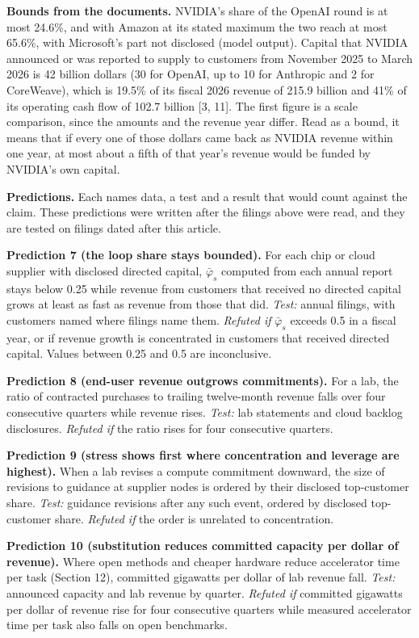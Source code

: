 \documentclass[10pt,letterpaper]{article}
\begin{document}
\textbf{Bounds from the documents.} NVIDIA's share of the OpenAI round
is at most 24.6\%, and with Amazon at its stated maximum the two reach
at most 65.6\%, with Microsoft's part not disclosed (model output).
Capital that NVIDIA announced or was reported to supply to customers
from November 2025 to March 2026 is 42 billion dollars (30 for OpenAI,
up to 10 for Anthropic and 2 for CoreWeave), which is 19.5\% of its
fiscal 2026 revenue of 215.9 billion and 41\% of its operating cash flow
of 102.7 billion {[}3, 11{]}. The first figure is a scale comparison,
since the amounts and the revenue year differ. Read as a bound, it means
that if every one of those dollars came back as NVIDIA revenue within
one year, at most about a fifth of that year's revenue would be funded
by NVIDIA's own capital.

\textbf{Predictions.} Each names data, a test and a result that would
count against the claim. These predictions were written after the
filings above were read, and they are tested on filings dated after this
article.

\textbf{Prediction 7 (the loop share stays bounded).} For each chip or
cloud supplier with disclosed directed capital, \(\bar\varphi_s\)
computed from each annual report stays below 0.25 while revenue from
customers that received no directed capital grows at least as fast as
revenue from those that did. \emph{Test:} annual filings, with customers
named where filings name them. \emph{Refuted if} \(\bar\varphi_s\)
exceeds 0.5 in a fiscal year, or if revenue growth is concentrated in
customers that received directed capital. Values between 0.25 and 0.5
are inconclusive.

\textbf{Prediction 8 (end-user revenue outgrows commitments).} For a
lab, the ratio of contracted purchases to trailing twelve-month revenue
falls over four consecutive quarters while revenue rises. \emph{Test:}
lab statements and cloud backlog disclosures. \emph{Refuted if} the
ratio rises for four consecutive quarters.

\textbf{Prediction 9 (stress shows first where concentration and
leverage are highest).} When a lab revises a compute commitment
downward, the size of revisions to guidance at supplier nodes is ordered
by their disclosed top-customer share. \emph{Test:} guidance revisions
after any such event, ordered by disclosed top-customer share.
\emph{Refuted if} the order is unrelated to concentration.

\textbf{Prediction 10 (substitution reduces committed capacity per
dollar of revenue).} Where open methods and cheaper hardware reduce
accelerator time per task (Section 12), committed gigawatts per dollar
of lab revenue fall. \emph{Test:} announced capacity and lab revenue by
quarter. \emph{Refuted if} committed gigawatts per dollar of revenue
rise for four consecutive quarters while measured accelerator time per
task also falls on open benchmarks.
\end{document}
